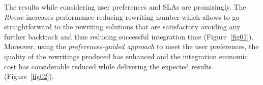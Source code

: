 The results while considering user preferences and SLAs are promisingly.  
The \textit{Rhone} increases performance reducing rewriting number which allows to go straightforward to the rewriting solutions that are satisfactory avoiding any further backtrack and thus reducing successful integration time (Figure~\ref{fig01}). Moreover, using the \textit{preferences-guided approach} to meet the user preferences, the quality of the rewritings produced has enhanced and the integration economic cost has considerable reduced while delivering the expected results (Figure~\ref{fig02}).